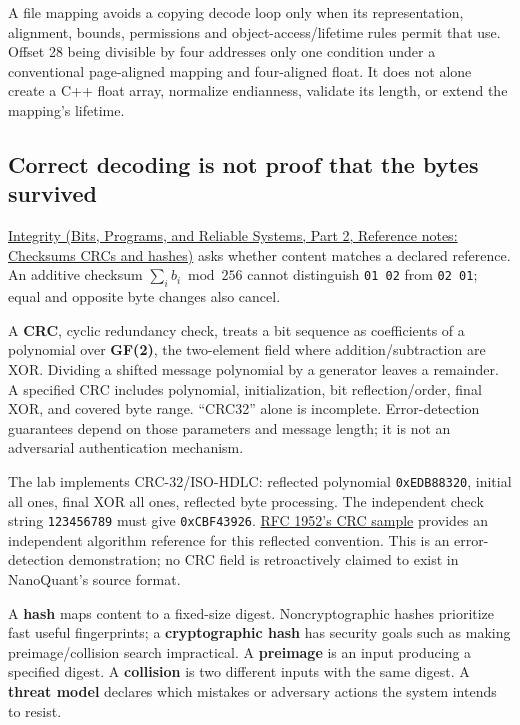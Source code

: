 A file mapping avoids a copying decode loop only when its representation, alignment, bounds, permissions and object-access/lifetime rules permit that use. Offset 28 being divisible by four addresses only one condition under a conventional page-aligned mapping and four-aligned float. It does not alone create a C++ float array, normalize endianness, validate its length, or extend the mapping's lifetime.

\subsection{Correct decoding is not proof that the bytes survived}\label{05-engine-i-ch002-correct-decoding-is-not-proof-that-the-bytes-survived}

\hypertarget{05-engine-i-ch002-correct-decoding-is-not-proof-that-the-bytes-survived}{}

\href{../01-Bits-Programs-and-Reliable-Systems-P02/main.pdf\#nameddest=appendix-ed338677de0a}{Integrity (Bits, Programs, and Reliable Systems, Part 2, Reference notes: Checksums CRCs and hashes)} asks whether content matches a declared reference. An additive checksum \(\sum_i b_i\bmod256\) cannot distinguish \texttt{01\ 02} from \texttt{02\ 01}; equal and opposite byte changes also cancel.

A \textbf{CRC}, cyclic redundancy check, treats a bit sequence as coefficients of a polynomial over \textbf{GF(2)}, the two-element field where addition/subtraction are XOR. Dividing a shifted message polynomial by a generator leaves a remainder. A specified CRC includes polynomial, initialization, bit reflection/order, final XOR, and covered byte range. ``CRC32'' alone is incomplete. Error-detection guarantees depend on those parameters and message length; it is not an adversarial authentication mechanism.

The lab implements CRC-32/ISO-HDLC: reflected polynomial \texttt{0xEDB88320}, initial all ones, final XOR all ones, reflected byte processing. The independent check string \texttt{123456789} must give \texttt{0xCBF43926}. \href{https://www.rfc-editor.org/rfc/rfc1952\#section-8}{RFC 1952's CRC sample} provides an independent algorithm reference for this reflected convention. This is an error-detection demonstration; no CRC field is retroactively claimed to exist in NanoQuant's source format.

A \textbf{hash} maps content to a fixed-size digest. Noncryptographic hashes prioritize fast useful fingerprints; a \textbf{cryptographic hash} has security goals such as making preimage/collision search impractical. A \textbf{preimage} is an input producing a specified digest. A \textbf{collision} is two different inputs with the same digest. A \textbf{threat model} declares which mistakes or adversary actions the system intends to resist.


